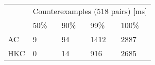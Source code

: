 \begin{tabular}{l|llll}
\multirow{2}{*}{} & \multicolumn{4}{c}{Counterexamples (518 pairs) {[}ms{]}} \\ \cline{2-5}
                  & 50\% & 90\%  & 99\%  & 100\%     \\ \hline
AC                & 9    & 94    & 1412  & 2887     \\
HKC               & 0    & 14    & 916   & 2685     \\
\end{tabular}
